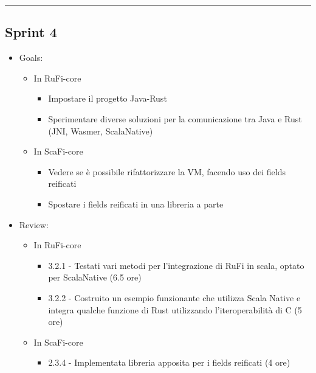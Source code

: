 \documentclass[12pt, a4paper]{article}
\begin{document}
\par\noindent\rule{\textwidth}{0.5pt}

\subsection*{Sprint 4}

\begin{itemize}
    \item Goals:
          \begin{itemize}
              \color{teal}
              \item In RuFi-core
                    \begin{itemize}
                        \item Impostare il progetto Java-Rust
                        \item Sperimentare diverse soluzioni per la comunicazione tra Java e Rust (JNI, Wasmer, ScalaNative)
                    \end{itemize}
                    \color{cyan}
              \item In ScaFi-core
                    \begin{itemize}
                        \item Vedere se è possibile rifattorizzare la VM, facendo uso dei fields reificati
                        \item Spostare i fields reificati in una libreria a parte
                    \end{itemize}
          \end{itemize}
    \item Review:
          \begin{itemize}
              \color{teal}
              \item In RuFi-core
                    \begin{itemize}
                        \item 3.2.1 - Testati vari metodi per l'integrazione di RuFi in scala, optato per ScalaNative (6.5 ore)
                        \item 3.2.2 - Costruito un esempio funzionante che utilizza Scala Native e integra qualche funzione di Rust utilizzando l'iteroperabilità di C (5 ore)
                    \end{itemize}
                    \color{cyan}
              \item In ScaFi-core
                    \begin{itemize}
                        \item 2.3.4 - Implementata libreria apposita per i fields reificati (4 ore)
                    \end{itemize}
          \end{itemize}
\end{itemize}
\end{document}
